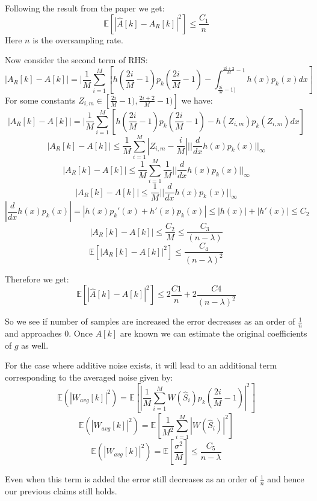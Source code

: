 \documentclass{article}
\begin{document}
Following the result from the paper we get:
$$\mathbb{E}[|\hat{A}[k] - A_R[k]|^2] \le \frac{C_1}{n}$$
Here $n$ is the oversampling rate.

Now consider the second term of RHS:
$$|A_R[k] - A[k]| = |\frac{1}{M} \sum_{i=1}^M [h(\frac{2i}{M} -1)p_k(\frac{2i}{M} -1) - \int_{\frac{2i}{M} -1)}^{\frac{2i+2}{M}-1}h(x)p_k(x)dx]$$
For some constants $Z_{i,m} \in [\frac{2i}{M} -1), \frac{2i+2}{M} -1)]$ we have:
$$|A_R[k] - A[k]| = |\frac{1}{M} \sum_{i=1}^M [h(\frac{2i}{M} -1)p_k(\frac{2i}{M} -1) - h(Z_{i,m})p_k(Z_{i,m})dx]$$
$$|A_R[k] - A[k]| \le \frac{1}{M}\sum_{i=1}^M |Z_{i,m} - \frac{i}{M}| ||\frac{d}{dx}h(x)p_k(x)||_{\infty}$$
$$|A_R[k] - A[k]| \le \frac{1}{M}\sum_{i=1}^M \frac{1}{M} ||\frac{d}{dx}h(x)p_k(x)||_{\infty}$$
$$|A_R[k] - A[k]| \le \frac{1}{M} ||\frac{d}{dx}h(x)p_k(x)||_{\infty}$$
$$|\frac{d}{dx}h(x)p_k(x)| = |h(x)p_k'(x) + h'(x)p_k(x)| \le |h(x)| + |h'(x)| \le C_2$$
$$|A_R[k] - A[k]| \le \frac{C_2}{M} \le \frac{C_3}{(n-\lambda)}$$
$$\mathbb{E}[|A_R[k] - A[k]|^2] \le \frac{C_4}{(n-\lambda)^2}$$

Therefore we get:
$$\mathbb{E}[|\hat{A}[k] - A[k]|^2] \le 2 \frac{C1}{n} + 2 \frac{C4}{(n-\lambda)^2}$$

So we see if number of samples are increased the error decreases as an order of $\frac{1}{n}$ and approaches 0. Once $A[k]$ are known we can estimate the original coefficients of $g$ as well.

For the case where additive noise exists, it will lead to an additional term corresponding to the averaged noise given by:
$$\mathbb{E}(|W_{avg}[k]|^2) = \mathbb{E}[|\frac{1}{M}\sum_{i=1}^M W(\hat{S}_i)p_k(\frac{2i}{M}-1)|^2]$$
$$\mathbb{E}(|W_{avg}[k]|^2) = \mathbb{E}[\frac{1}{M^2}\sum_{i=1}^M |W(\hat{S}_i)|^2]$$
$$\mathbb{E}(|W_{avg}[k]|^2) = \mathbb{E}[\frac{\sigma^2}{M}] \le \frac{C_5}{n-\lambda}$$

Even when this term is added the error still decreases as an order of $\frac{1}{n}$ and hence our previous claims still holds.
\end{document}

